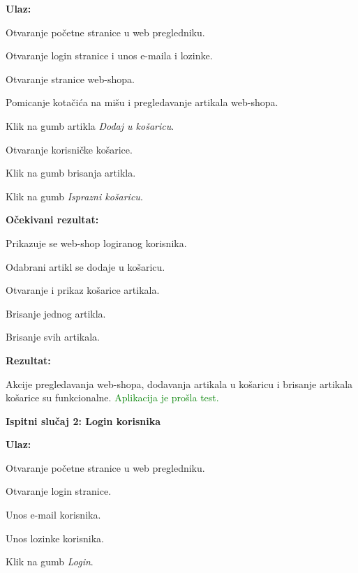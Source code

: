 		 	\textnormal{\textbf{Ulaz:}}
		 	
		 	\begin{packed_enum}
		 		\item Otvaranje početne stranice u web pregledniku.
		 		\item Otvaranje login stranice i unos e-maila i lozinke.
		 		\item Otvaranje stranice web-shopa.
		 		\item Pomicanje kotačića na mišu i pregledavanje artikala web-shopa.
		 		\item Klik na gumb artikla \textit{Dodaj u košaricu}.
		 		\item Otvaranje korisničke košarice.
		 		\item Klik na gumb brisanja artikla.
		 		\item Klik na gumb \textit{Isprazni košaricu}.
		 	\end{packed_enum}
	 	
	 		\textnormal{\textbf{Očekivani rezultat:}}
	 		
	 		\begin{packed_enum}
	 			\item Prikazuje se web-shop logiranog korisnika.
	 			\item Odabrani artikl se dodaje u košaricu.
	 			\item Otvaranje i prikaz košarice artikala.
	 			\item Brisanje jednog artikla.
	 			\item Brisanje svih artikala.
	 		\end{packed_enum}
 		
 			\textnormal{\textbf{Rezultat:}}
 			
 			\textnormal{Akcije pregledavanja web-shopa, dodavanja artikala u košaricu i brisanje artikala košarice su funkcionalne. \textcolor{green}{Aplikacija je prošla test.\\}}
 			
 			\textnormal{\textbf{Ispitni slučaj 2: Login korisnika}\\}
 			
 			\textnormal{\textbf{Ulaz:}}
 			
 			\begin{packed_enum}
 				\item Otvaranje početne stranice u web pregledniku.
 				\item Otvaranje login stranice.
 				\item Unos e-mail korisnika.
 				\item Unos lozinke korisnika.
 				\item Klik na gumb \textit{Login}.
 			\end{packed_enum}
 			
